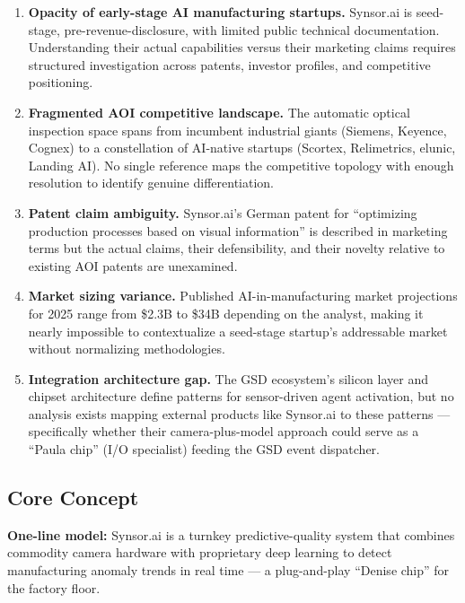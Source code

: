 \documentclass[11pt,letterpaper]{article}
\begin{document}
\begin{enumerate}[leftmargin=2em]
  \item \textbf{Opacity of early-stage AI manufacturing startups.} Synsor.ai is seed-stage, pre-revenue-disclosure, with limited public technical documentation. Understanding their actual capabilities versus their marketing claims requires structured investigation across patents, investor profiles, and competitive positioning.

  \item \textbf{Fragmented AOI competitive landscape.} The automatic optical inspection space spans from incumbent industrial giants (Siemens, Keyence, Cognex) to a constellation of AI-native startups (Scortex, Relimetrics, elunic, Landing AI). No single reference maps the competitive topology with enough resolution to identify genuine differentiation.

  \item \textbf{Patent claim ambiguity.} Synsor.ai's German patent for ``optimizing production processes based on visual information'' is described in marketing terms but the actual claims, their defensibility, and their novelty relative to existing AOI patents are unexamined.

  \item \textbf{Market sizing variance.} Published AI-in-manufacturing market projections for 2025 range from \$2.3B to \$34B depending on the analyst, making it nearly impossible to contextualize a seed-stage startup's addressable market without normalizing methodologies.

  \item \textbf{Integration architecture gap.} The GSD ecosystem's silicon layer and chipset architecture define patterns for sensor-driven agent activation, but no analysis exists mapping external products like Synsor.ai to these patterns --- specifically whether their camera-plus-model approach could serve as a ``Paula chip'' (I/O specialist) feeding the GSD event dispatcher.
\end{enumerate}

\subsection{Core Concept}

\begin{quotebox}
\textbf{One-line model:} Synsor.ai is a turnkey predictive-quality system that combines commodity camera hardware with proprietary deep learning to detect manufacturing anomaly trends in real time --- a plug-and-play ``Denise chip'' for the factory floor.
\end{quotebox}
\end{document}
